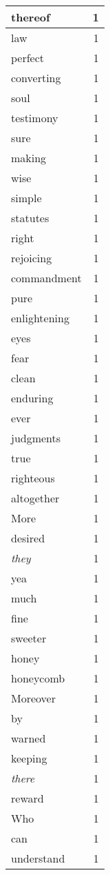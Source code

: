 \begin{center}
\begin{longtable}{l|r}
thereof & 1 \\ \hline
law & 1 \\ \hline
perfect & 1 \\ \hline
converting & 1 \\ \hline
soul & 1 \\ \hline
testimony & 1 \\ \hline
sure & 1 \\ \hline
making & 1 \\ \hline
wise & 1 \\ \hline
simple & 1 \\ \hline
statutes & 1 \\ \hline
right & 1 \\ \hline
rejoicing & 1 \\ \hline
commandment & 1 \\ \hline
pure & 1 \\ \hline
enlightening & 1 \\ \hline
eyes & 1 \\ \hline
fear & 1 \\ \hline
clean & 1 \\ \hline
enduring & 1 \\ \hline
ever & 1 \\ \hline
judgments & 1 \\ \hline
true & 1 \\ \hline
righteous & 1 \\ \hline
altogether & 1 \\ \hline
More & 1 \\ \hline
desired & 1 \\ \hline
\emph{they} & 1 \\ \hline
yea & 1 \\ \hline
much & 1 \\ \hline
fine & 1 \\ \hline
sweeter & 1 \\ \hline
honey & 1 \\ \hline
honeycomb & 1 \\ \hline
Moreover & 1 \\ \hline
by & 1 \\ \hline
warned & 1 \\ \hline
keeping & 1 \\ \hline
\emph{there} & 1 \\ \hline
reward & 1 \\ \hline
Who & 1 \\ \hline
can & 1 \\ \hline
understand & 1 \\ \hline

\end{longtable}
\end{center}
